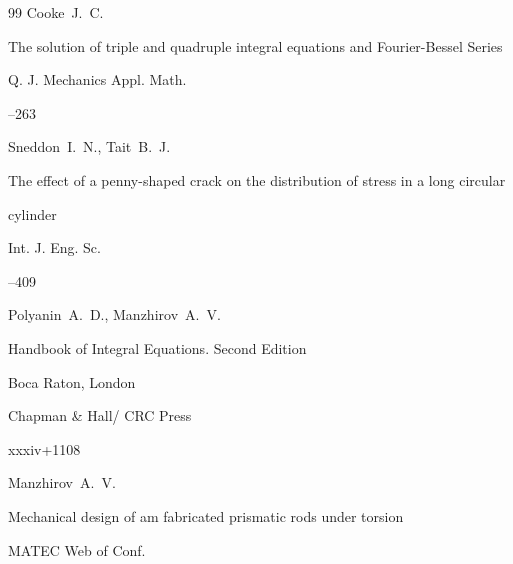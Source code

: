 \begin{thebibliography}{99}
\by Cooke~J.~C.

\paper The solution of triple and quadruple integral equations and Fourier-Bessel Series

\jour Q. J. Mechanics Appl. Math.




--263







\by Sneddon~I.~N., Tait~B.~J.

\paper The effect of a penny-shaped crack on the distribution of stress in a long circular

cylinder

\jour Int. J. Eng. Sc.




--409





\by Polyanin~A.~D., Manzhirov~A.~V.

\book Handbook of Integral Equations. Second Edition

\publaddr Boca Raton, London

\publ Chapman \& Hall/ CRC Press


\totalpages  xxxiv+1108





\by Manzhirov~A.~V.

\paper Mechanical design of am fabricated prismatic rods under torsion

\jour MATEC Web of Conf.







\end{thebibliography}









%

